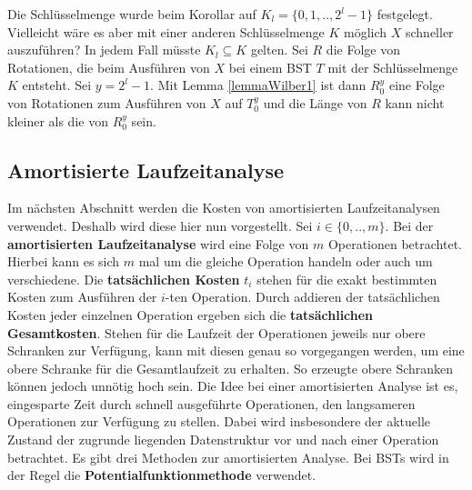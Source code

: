 \documentclass[a4paper,12pt]{article}
\begin{document}
\noindent Die Schlüsselmenge  wurde beim Korollar auf ${K_l = \{0,1,..,2^l -1\}}$ festgelegt. Vielleicht wäre es aber mit einer anderen Schlüsselmenge $K$ möglich $X$ schneller auszuführen? In jedem Fall müsste $K_l \subseteq K$ gelten. Sei $R$ die Folge von Rotationen, die beim Ausführen von $X$ bei einem BST $T$ mit der Schlüsselmenge $K$ entsteht. Sei $y = 2^l -1$. Mit Lemma \ref{lemmaWilber1} ist dann $R_0^y$ eine Folge von Rotationen zum Ausführen von $X$ auf $T_0^y$ und die Länge von $R$ kann nicht kleiner als die von $R_0^y$ sein. 



\subsection{Amortisierte Laufzeitanalyse}
Im nächsten Abschnitt werden die Kosten von amortisierten Laufzeitanalysen verwendet. Deshalb wird diese hier nun vorgestellt.
Sei $i \in \{0,..,m\}$. Bei der \textbf{amortisierten Laufzeitanalyse} wird eine Folge von $m$ Operationen betrachtet. Hierbei kann es sich $m$ mal um die gleiche Operation handeln oder auch um verschiedene. Die \textbf{tatsächlichen Kosten}  $t_i$ stehen für die exakt bestimmten Kosten zum Ausführen der $i$-ten Operation. Durch addieren der tatsächlichen Kosten jeder einzelnen Operation ergeben sich die \textbf{tatsächlichen Gesamtkosten}. Stehen für die Laufzeit der Operationen jeweils nur obere Schranken zur Verfügung, kann mit diesen genau so vorgegangen werden, um eine obere Schranke für die Gesamtlaufzeit zu erhalten. So erzeugte obere Schranken können jedoch unnötig hoch sein. Die Idee bei einer amortisierten Analyse ist es, eingesparte Zeit durch schnell ausgeführte Operationen, den langsameren Operationen zur Verfügung zu stellen. Dabei wird insbesondere der aktuelle Zustand der zugrunde liegenden Datenstruktur vor und nach einer Operation betrachtet. Es gibt drei Methoden zur amortisierten Analyse. Bei BSTs wird in der Regel die \textbf{Potentialfunktionmethode} verwendet.
\end{document}
